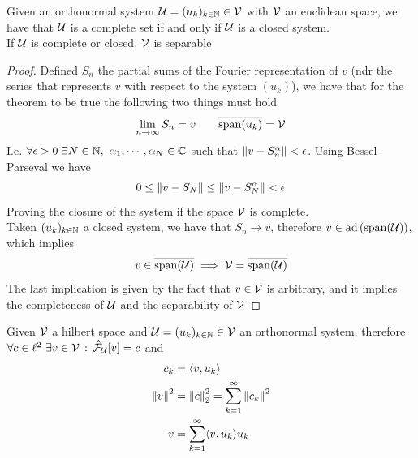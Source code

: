 \documentclass[../complete.tex]{subfiles}
\begin{document}
\begin{thm}
	Given an orthonormal system $\operatorname{\mathcal{U}}=(u_k)_{k\in\mathbb{N}}\in\mathcal{V}$ with $\mathcal{V}$ an euclidean space, we have that $\operatorname{\mathcal{U}}$ is a complete set if and only if $\operatorname{\mathcal{U}}$ is a closed system.\\
	If $\operatorname{\mathcal{U}}$ is complete or closed, $\mathcal{V}$ is separable
\end{thm}
\begin{proof}
	Defined $S_n$ the partial sums of the Fourier representation of $v$ (ndr the series that represents $v$ with respect to the system $(u_k)$), we have that for the theorem to be true the following two things must hold
	\begin{equation*}
		\lim_{n\to\infty}S_n=v\qquad\overline{\mathrm{span}{(u_k)}}=\mathcal{V}
	\end{equation*}
	I.e. $\forall\epsilon>0\ \exists N\in\N,\ \alpha_1,\cdots,\alpha_N\in\Cf$ such that $\norm{v-S_n^\alpha}<\epsilon$. Using Bessel-Parseval we have
	\begin{equation*}
		0\le\norm{v-S_N}\le\norm{v-S_N^\alpha}<\epsilon
	\end{equation*}
	Proving the closure of the system if the space $\mathcal{V}$ is complete.\\
	Taken $(u_k)_{k\in\mathbb{N}}$ a closed system, we have that $S_n\to v$, therefore $v\in\operatorname{ad}\left( \mathrm{span}(\operatorname{\mathcal{U}}) \right)$, which implies
	\begin{equation*}
		v\in\overline{\mathrm{span}(\operatorname{\mathcal{U}})}\implies{}\mathcal{V}=\overline{\mathrm{span}(\operatorname{\mathcal{U}})}
	\end{equation*}
	The last implication is given by the fact that $v\in\mathcal{V}$ is arbitrary, and it implies the completeness of $\operatorname{\mathcal{U}}$ and the separability of $\mathcal{V}$
\end{proof}
\begin{thm}
	Given $\mathcal{V}$ a hilbert space and $\operatorname{\mathcal{U}}=(u_k)_{k\in\mathbb{N}}\in\mathcal{V}$ an orthonormal system, therefore $\forall c\in\ell^2\ \exists v\in\mathcal{V}\, :\, \hat{\mathcal{F}}_{\operatorname{\mathcal{U}}}[v]=c$ and
	\begin{equation*}
		\begin{aligned}
			c_k&=\langle v, u_k \rangle\\
			\norm{v}^2&=\norm{c}^2_2=\sum_{k=1}^{\infty}\norm{c_k}^2\\
			v&=\sum_{k=1}^{\infty}\langle v, u_k \rangle u_k
		\end{aligned}
	\end{equation*}
\end{thm}
\end{document}
